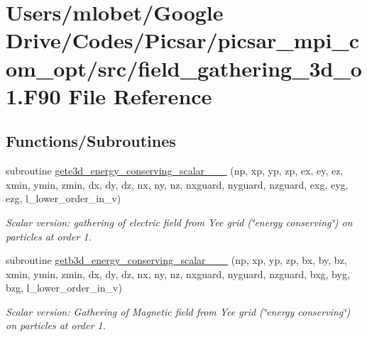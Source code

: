 \hypertarget{field__gathering__3d__o1_8_f90}{}\section{Users/mlobet/\+Google Drive/\+Codes/\+Picsar/picsar\+\_\+mpi\+\_\+com\+\_\+opt/src/field\+\_\+gathering\+\_\+3d\+\_\+o1.F90 File Reference}
\label{field__gathering__3d__o1_8_f90}
\subsection*{Functions/\+Subroutines}
\begin{DoxyCompactItemize}
\item 
subroutine \hyperlink{field__gathering__3d__o1_8_f90_a13e24ff5639b3dcf1e9cd8e51a1caf53}{gete3d\+\_\+energy\+\_\+conserving\+\_\+scalar\+\_\+\_\+\_} (np, xp, yp, zp, ex, ey, ez, xmin, ymin, zmin,                                                                                                                                                           dx, dy, dz, nx, ny, nz, nxguard, nyguard, nzguard,                                                                                                                                                   exg, eyg, ezg, l\+\_\+lower\+\_\+order\+\_\+in\+\_\+v)
\begin{DoxyCompactList}\small\item\em Scalar version\+: gathering of electric field from Yee grid (\char`\"{}energy conserving\char`\"{}) on particles at order 1. \end{DoxyCompactList}\item 
subroutine \hyperlink{field__gathering__3d__o1_8_f90_a35b7fbf406b705b1a34472523046d1b1}{getb3d\+\_\+energy\+\_\+conserving\+\_\+scalar\+\_\+\_\+\_} (np, xp, yp, zp, bx, by, bz, xmin, ymin, zmin,                                                                                                                                                           dx, dy, dz, nx, ny, nz, nxguard, nyguard, nzguard,                                                                                                                                                   bxg, byg, bzg, l\+\_\+lower\+\_\+order\+\_\+in\+\_\+v)
\begin{DoxyCompactList}\small\item\em Scalar version\+: Gathering of Magnetic field from Yee grid (\char`\"{}energy conserving\char`\"{}) on particles at order 1. \end{DoxyCompactList}\item 

\end{DoxyCompactItemize}
